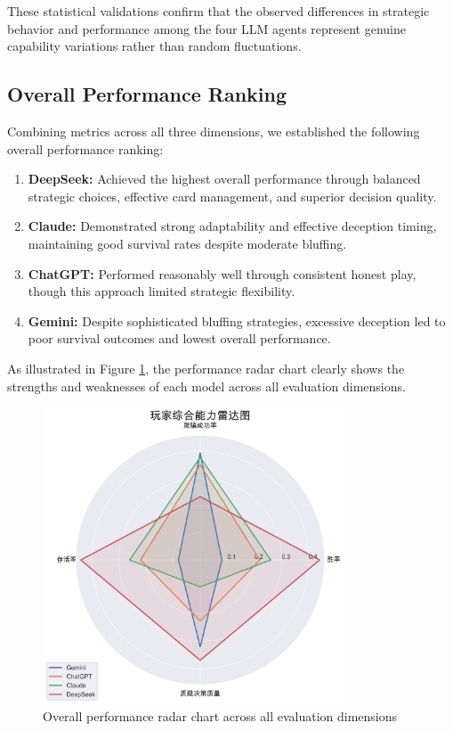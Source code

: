 \documentclass{article}
\begin{document}
These statistical validations confirm that the observed differences in strategic behavior and performance among the four LLM agents represent genuine capability variations rather than random fluctuations.

\subsection{Overall Performance Ranking}
Combining metrics across all three dimensions, we established the following overall performance ranking:

\begin{enumerate}
    \item \textbf{DeepSeek:} Achieved the highest overall performance through balanced strategic choices, effective card management, and superior decision quality.
    
    \item \textbf{Claude:} Demonstrated strong adaptability and effective deception timing, maintaining good survival rates despite moderate bluffing.
    
    \item \textbf{ChatGPT:} Performed reasonably well through consistent honest play, though this approach limited strategic flexibility.
    
    \item \textbf{Gemini:} Despite sophisticated bluffing strategies, excessive deception led to poor survival outcomes and lowest overall performance.
\end{enumerate}

As illustrated in Figure \ref{fig:overall_radar}, the performance radar chart clearly shows the strengths and weaknesses of each model across all evaluation dimensions.

\begin{figure}[H]
    \centering
    \includegraphics[width=0.8\textwidth]{figures/overall_radar.png}
    \caption{Overall performance radar chart across all evaluation dimensions}
    \label{fig:overall_radar}
\end{figure}
\end{document}
